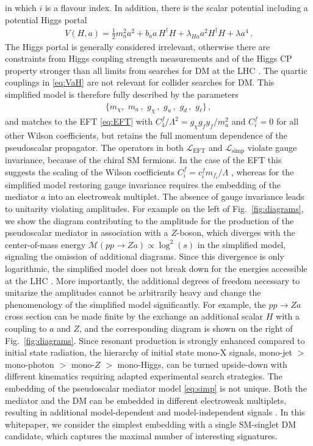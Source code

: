 in which $i$ is a flavour index. In addition, there is the scalar potential including a potential Higgs portal 
\begin{align}\label{eq:VaH}
V(H, a)=\frac{1}{2}m_a^2 a^2+b_{a} a\,H^\dagger H +\lambda_{Ha} a^2H^\dagger H + \lambda a^4\,.
\end{align}
The Higgs portal is generally considered irrelevant, otherwise there are constraints from Higgs coupling strength measurements and of the Higgs CP property stronger than all limits from searches for DM at the LHC \cite{}. The quartic couplings in \eqref{eq:VaH} are not relevant for collider searches for DM.
This simplified model is therefore fully described by the parameters 
\begin{align}
\big\{ m_\chi, \,\, m_a\,,\,\, g_\chi\,, \,\, g_u\,,\,\,g_d\,,\,\, g_\ell \big\}\,,
\end{align}
and
matches to the EFT \eqref{eq:EFT} with $C^f_4/\Lambda^2 = g_\chi g_f y_f  /m_a^2$ and $C_i^f=0$ for all other Wilson coefficients, but retains the full momentum dependence of the pseudoscalar propagator.  The operators in both $\mathcal{L}_\text{EFT}$ and $\mathcal{L}_\text{simp}$ violate gauge invariance, because of the chiral SM fermions. In the case of the EFT this suggests the scaling of the Wilson coefficients $C_i^f= c_i^f m_{f_i}/\Lambda$ \cite{}, whereas for the simplified model restoring gauge invariance requires the embedding of the mediator $a$ into an electroweak multiplet. The absence of gauge invariance leads to unitarity violating amplitudes. For example on the left of Fig.~\ref{fig:diagrams}, we show the diagram contributing to the amplitude for the production of the pseudoscalar mediator in association with a $Z$-boson, which diverges with the center-of-mass energy $\mathcal{M}(pp\to Z a) \propto \log^2(s)$ in the simplified model, signaling the omission of additional diagrams. Since this divergence is only logarithmic, the simplified model does not break down for the energies accessible at the LHC \cite{}. More importantly, the additional degrees of freedom necessary to unitarize the amplitudes cannot be arbitrarily heavy and change the phenomenology of the simplified model significantly. For example, the $pp\to Z a$ cross section can be made finite by the exchange an additional scalar $H$ with a coupling to $a$ and $Z$, and the corresponding diagram is shown on the right of Fig.~\ref{fig:diagrams}. Since resonant production is strongly enhanced compared to initial state radiation, the hierarchy of initial state mono-X signals, mono-jet $>$ mono-photon $>$ mono-$Z$ $>$ mono-Higgs, can be turned upside-down with different kinematics requiring adapted experimental search strategies. The embedding of the pseudoscalar mediator model \eqref{eq:simp} is not unique. Both the mediator and the DM can be embedded in different electroweak multiplets, resulting in additional model-dependent and model-independent signals \cite{}. In this whitepaper, we consider the simplest embedding with a single SM-singlet DM candidate, which captures the maximal number of interesting signatures.     


